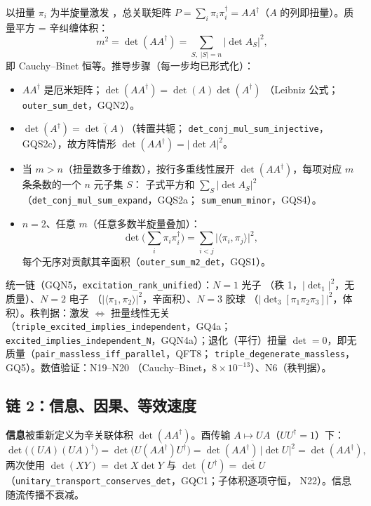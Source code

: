 \documentclass[aps,prd,preprint,superscriptaddress,amsmath,amssymb]{revtex4-2}
\begin{document}
以扭量 $\pi_i$ 为半旋量激发 \cite{penrose1967twistor}，总关联矩阵
$P=\sum_i\pi_i\pi_i^\dagger=AA^\dagger$（$A$ 的列即扭量）。质量平方 =
辛纠缠体积：
\begin{equation}
m^2=\det(AA^\dagger)=\sum_{S,\;|S|=n}\big|\det A_S\big|^2,
\label{eq:cb}
\end{equation}
即 Cauchy--Binet 恒等。推导步骤（每一步均已形式化）：
\begin{itemize}
\item $AA^\dagger$ 是厄米矩阵；$\det(AA^\dagger)=\det(A)\det(A^\dagger)$
（Leibniz 公式；\texttt{outer\_sum\_det}，GQN2）。
\item $\det(A^\dagger)=\overline{\det(A)}$（转置共轭；
\texttt{det\_conj\_mul\_sum\_injective}，GQS2c），故方阵情形
$\det(AA^\dagger)=|\det A|^2$。
\item 当 $m>n$（扭量数多于维数），按行多重线性展开
$\det(AA^\dagger)$，每项对应 $m$ 条条数的一个 $n$ 元子集 $S$：
子式平方和 $\sum_S|\det A_S|^2$
（\texttt{det\_conj\_mul\_sum\_expand}，GQS2a；
\texttt{sum\_enum\_minor}，GQS4）。
\item $n=2$、任意 $m$（任意多数半旋量叠加）：
\begin{equation}
\det\Big(\sum_{i}\pi_i\pi_i^\dagger\Big)=\sum_{i<j}\big|\langle\pi_i,\pi_j\rangle\big|^2,
\label{eq:cb2}
\end{equation}
每个无序对贡献其辛面积（\texttt{outer\_sum\_m2\_det}，GQS1）。
\end{itemize}
统一链（GQN5，\texttt{excitation\_rank\_unified}）：$N=1$ 光子
（秩 1，$|\det_1|^2$，无质量）、$N=2$ 电子
（$|\langle\pi_1,\pi_2\rangle|^2$，辛面积）、$N=3$ 胶球
（$|\det_3[\pi_1\pi_2\pi_3]|^2$，体积）。秩判据：激发 $\Leftrightarrow$
扭量线性无关（\texttt{triple\_excited\_implies\_independent}，GQ4a；
\texttt{excited\_implies\_independent\_N}，GQN4a）；退化（平行）扭量
$\det=0$，即无质量（\texttt{pair\_massless\_iff\_parallel}，QFT8；
\texttt{triple\_degenerate\_massless}，GQ5）。数值验证：N19--N20
（Cauchy--Binet，$8\times10^{-13}$）、N6（秩判据）。

\subsection{链 2：信息、因果、等效速度}
\label{app:chain2}

\textbf{信息}被重新定义为辛关联体积 $\det(AA^\dagger)$。酉传输
$A\mapsto UA$（$UU^\dagger=1$）下：
\begin{equation}
\det\big((UA)(UA)^\dagger\big)
=\det\big(U(AA^\dagger)U^\dagger\big)
=\det(AA^\dagger)\,\big|\det U\big|^2
=\det(AA^\dagger),
\label{eq:unit}
\end{equation}
两次使用 $\det(XY)=\det X\det Y$ 与 $\det(U^\dagger)=\overline{\det U}$
（\texttt{unitary\_transport\_conserves\_det}，GQC1；子体积逐项守恒，
N22）。信息随流传播不衰减。
\end{document}
